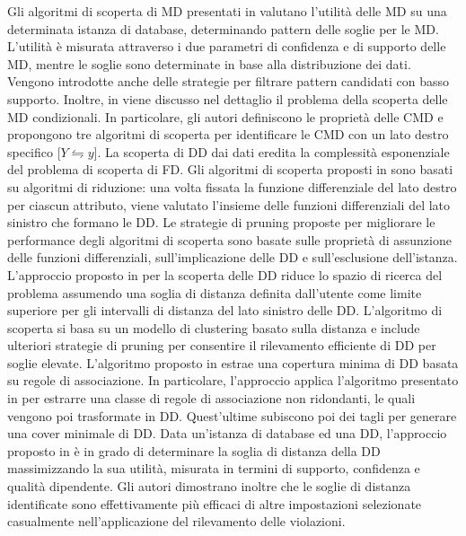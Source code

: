 Gli algoritmi di scoperta di MD presentati in \cite{efficientdiscoveryofsimilarity} valutano l'utilit\`{a} delle MD su una determinata istanza di database, determinando pattern delle soglie per le MD. L'utilit\`{a} \`{e} misurata attraverso i due parametri di confidenza e di supporto delle MD, mentre le soglie sono determinate in base alla distribuzione dei dati. Vengono introdotte anche delle strategie per filtrare pattern candidati con basso supporto. Inoltre, in \cite{discoveringconditionalmatchingrules} viene discusso nel dettaglio il problema della scoperta delle MD condizionali. In particolare, gli autori definiscono le propriet\`{a} delle CMD e propongono tre algoritmi di scoperta per identificare le CMD con un lato destro specifico [$Y\leftrightharpoons y$]. La scoperta di DD dai dati eredita la complessit\`{a} esponenziale del problema di scoperta di FD. Gli algoritmi di scoperta proposti in \cite{differentialdependencies} sono basati su algoritmi di riduzione: una volta fissata la funzione differenziale del lato destro per ciascun attributo, viene valutato l'insieme delle funzioni differenziali del lato sinistro che formano le DD. Le strategie di pruning proposte per migliorare le performance degli algoritmi di scoperta sono basate sulle propriet\`{a} di assunzione delle funzioni differenziali, sull'implicazione delle DD e sull'esclusione dell'istanza. L'approccio proposto in \cite{miningdd} per la scoperta delle DD riduce lo spazio di ricerca del problema assumendo una soglia di distanza definita dall'utente come limite superiore per gli intervalli di distanza del lato sinistro delle DD. L'algoritmo di scoperta si basa su un modello di clustering basato sulla distanza e include ulteriori strategie di pruning per consentire il rilevamento efficiente di DD per soglie elevate. L'algoritmo proposto in \cite{efficientdiscoverydd} estrae una copertura minima di DD basata su regole di associazione. In particolare, l'approccio applica l'algoritmo presentato in \cite{optimalrulediscovry} per estrarre una classe di regole di associazione non ridondanti, le quali vengono poi trasformate in DD. Quest'ultime subiscono poi dei tagli per generare una cover minimale di DD. Data un'istanza di database ed una DD, l'approccio proposto in \cite{efficientdeterminationofdistance4dd} \`{e} in grado di determinare la soglia di distanza della DD massimizzando la sua utilit\`{a}, misurata in termini di supporto, confidenza e qualit\`{a} dipendente. Gli autori dimostrano inoltre che le soglie di distanza identificate sono effettivamente pi\`{u} efficaci di altre impostazioni selezionate casualmente nell'applicazione del rilevamento delle violazioni.\par
